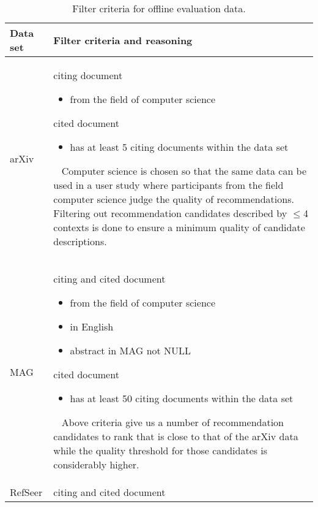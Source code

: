 
\begin{table}[]
\centering
    \caption{Filter criteria for offline evaluation data.}
    \label{tab:datasetfilter}
\begin{center}
    \begin{tabular}{lp{11.5cm}}
    \toprule
    Data set & Filter criteria and reasoning\\
    \midrule
    arXiv & citing document
            \begin{itemize}
                \item from the field of computer science
            \end{itemize}
            cited document
            \begin{itemize}
                \item has at least 5 citing documents within the data set
            \end{itemize}
            \ 
            \newline
            Computer science is chosen so that the same data can be used in a user study where participants from the field computer science judge the quality of recommendations.
            \newline
            Filtering out recommendation candidates described by $\le$4 contexts is done to ensure a minimum quality of candidate descriptions.\\
    \midrule
    MAG & citing and cited document
            \begin{itemize}
                \item from the field of computer science
                \item in English
                \item abstract in MAG not NULL
            \end{itemize}
            cited document
            \begin{itemize}
                \item has at least 50 citing documents within the data set
            \end{itemize}
            \ 
            \newline
            Above criteria give us a number of recommendation candidates to rank that is close to that of the arXiv data while the quality threshold for those candidates is considerably higher.\\
    \midrule
    RefSeer & citing and cited document

\end{tabular}
\end{center}
\end{table}

